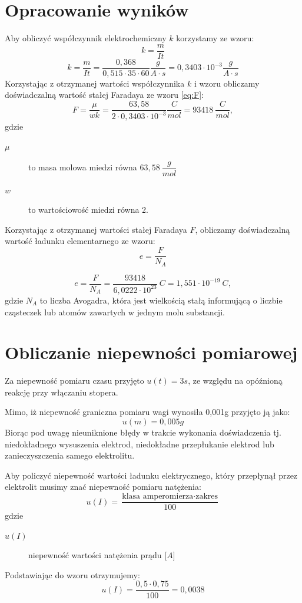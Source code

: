 \documentclass[a4paper,11pt]{article}
\begin{document}
\section{Opracowanie wyników}
Aby obliczyć współczynnik elektrochemiczny $k$ korzystamy ze wzoru:
\begin{equation}
k = \frac{m}{It}
\end{equation}
$$
k = \frac{m}{I t} = \frac{0,368}{0,515 \cdot 35 \cdot 60} \frac{g}{A \cdot s}  = 0,3403 \cdot 10^{-3} \frac{g}{A \cdot s} 
$$
Korzystając z otrzymanej wartości współczynnika  $k$ i  wzoru obliczamy doświadczalną wartość stałej Faradaya ze wzoru {\ref{eq:F}}:
$$
F = \frac{\mu}{w k} = \frac{63,58 }{2 \cdot 0,3403 \cdot 10^{-3}} \frac{C}{mol} = 93418~\frac{C}{mol}, 
$$
gdzie 
\begin{description}
\item [$\mu$] to masa molowa miedzi równa $63,58 ~\dfrac{g}{mol}$
\item [$w$] to wartościowość miedzi równa 2.
\end{description}

Korzystając z otrzymanej wartości stałej Faradaya  $F$, obliczamy doświadczalną wartość ładunku elementarnego ze wzoru:
\begin{equation}
e = \frac{F}{N_A}
\end{equation}

$$
e = \frac{F}{N_A} = \frac{93418}{6,0222 \cdot 10^{23}}~C = 1,551 \cdot 10^{-19}~C,  
$$
gdzie $N_A$ to liczba Avogadra, która jest wielkością stałą informującą o liczbie cząsteczek lub atomów zawartych w jednym molu substancji. 

\section{Obliczanie niepewności pomiarowej}
\indent Za niepewność pomiaru czasu przyjęto $u(t)=3s$, ze względu na opóźnioną reakcję przy włączaniu stopera. 

\indent Mimo, iż niepewność graniczna pomiaru wagi wynosiła 0,001g przyjęto ją jako:
$$
u(m) = 0,005 g
$$
Biorąc pod uwagę nieuniknione błędy w trakcie wykonania doświadczenia tj. niedokładnego wysuszenia elektrod, niedokładne przepłukanie elektrod lub zanieczyszczenia samego elektrolitu.

\indent Aby policzyć niepewność wartości ładunku elektrycznego, który przepłynął przez elektrolit musimy znać niepewność pomiaru natężenia:
\begin{equation}
u(I) = \frac{\text{klasa amperomierza} \cdot \text{zakres}}{100}
\end{equation}
gdzie 
\begin{description}
\item [$u(I)$] niepewność wartości natężenia prądu [$A$]
\end{description}
Podstawiając do wzoru otrzymujemy:
$$
u(I) = \frac{0,5 \cdot 0,75}{100} = 0,0038
$$
\end{document}
